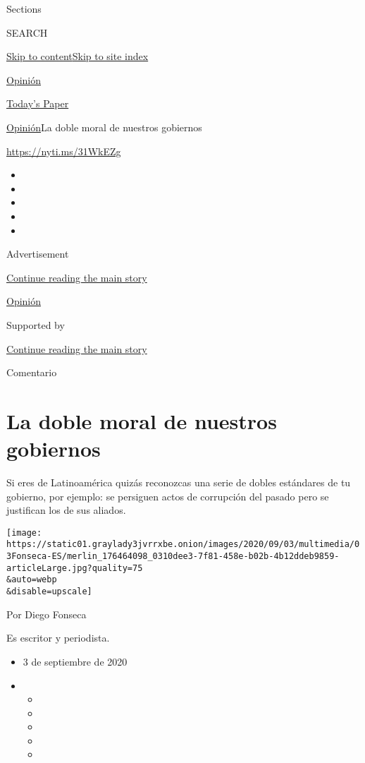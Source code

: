 Sections

SEARCH

\protect\hyperlink{site-content}{Skip to
content}\protect\hyperlink{site-index}{Skip to site index}

\href{https://www.nytimes3xbfgragh.onion/es/section/opinion}{Opinión}

\href{https://myaccount.nytimes3xbfgragh.onion/auth/login?response_type=cookie\&client_id=vi}{}

\href{https://www.nytimes3xbfgragh.onion/section/todayspaper}{Today's
Paper}

\href{/es/section/opinion}{Opinión}\textbar{}La doble moral de nuestros
gobiernos

\url{https://nyti.ms/31WkEZg}

\begin{itemize}
\item
\item
\item
\item
\item
\end{itemize}

Advertisement

\protect\hyperlink{after-top}{Continue reading the main story}

\href{/es/section/opinion}{Opinión}

Supported by

\protect\hyperlink{after-sponsor}{Continue reading the main story}

Comentario

\hypertarget{la-doble-moral-de-nuestros-gobiernos}{%
\section{La doble moral de nuestros
gobiernos}\label{la-doble-moral-de-nuestros-gobiernos}}

Si eres de Latinoamérica quizás reconozcas una serie de dobles
estándares de tu gobierno, por ejemplo: se persiguen actos de corrupción
del pasado pero se justifican los de sus aliados.

\texttt{[image: https://static01.graylady3jvrrxbe.onion/images/2020/09/03/multimedia/03Fonseca-ES/merlin\_176464098\_0310dee3-7f81-458e-b02b-4b12ddeb9859-articleLarge.jpg?quality=75\\\&auto=webp\\\&disable=upscale]}

Por Diego Fonseca

Es escritor y periodista.

\begin{itemize}
\item
  3 de septiembre de 2020
\item
  \begin{itemize}
  \item
  \item
  \item
  \item
  \item
  \end{itemize}
\end{itemize}

